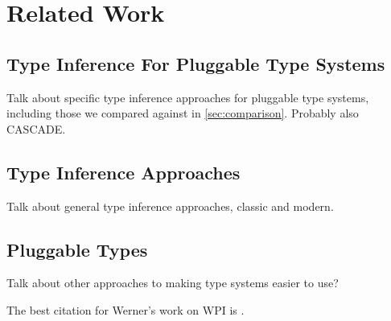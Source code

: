 \section{Related Work}
\label{sec:relatedwork}

\subsection{Type Inference For Pluggable Type Systems}
\label{sec:rw:type-inference-pluggable}

Talk about specific type inference approaches for pluggable type systems, including those we
compared against in \cref{sec:comparison}. Probably also CASCADE.

\subsection{Type Inference Approaches}
\label{sec:rw:type-inference}

Talk about general type inference approaches, classic and modern.

\subsection{Pluggable Types}
\label{sec:pluggable}

Talk about other approaches to making type systems easier to use?


The best citation for Werner's work on WPI is \cite{XiangLD2020}.
